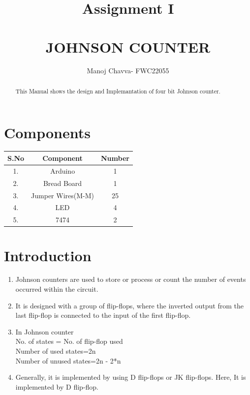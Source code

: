 \documentclass[journal,12pt,twocolumn]{IEEEtran}
\title{Assignment \textrm{I} \\ \textbf{\\JOHNSON COUNTER}}
\author{Manoj Chavva- FWC22055}
\begin{document}
\maketitle

\tableofcontents
\vspace{0.5cm}
\begin{abstract}
  This Manual shows the design and Implemantation of four bit Johnson counter.
\end{abstract}   


 
     \section{Components}  
       

\begin{tabular}{|c|c|c|}
    \hline 
      \textbf{S.No} & \textbf{Component} & \textbf{Number}\\
      \hline
	1. & Arduino & 1 \\
	2. & Bread Board & 1 \\
	3. & Jumper Wires(M-M) & 25 \\
	4. & LED & 4 \\
	5. & 7474 & 2\\
      \hline
      
   \end{tabular}
   

     \vspace{0.35cm}




\section{Introduction}
\begin{enumerate}
  \item Johnson counters are used to store or process or count the number of events occurred within the circuit.
  \item It is designed with a group of flip-flops, where the inverted output from the last flip-flop is connected to the input of the first flip-flop.
  \item In Johnson counter
  \\No. of states = No. of flip-flop used  
\\Number of used states=2n  
\\Number of unused states=2n - 2*n  
\item Generally, it is implemented by using D flip-flops or JK flip-flops. 
Here, It is implemented by D flip-flop.
\end{enumerate}
\end{document}
